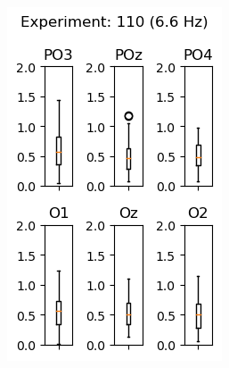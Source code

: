 \begin{figure}[ht]
    \centering
    \begin{subfigure}{0.25\linewidth}
        \includegraphics[width=\linewidth]{images/appendix/11066.png}
        \label{fig:11066}
    \end{subfigure}
    \begin{subfigure}{0.25\linewidth}

\end{subfigure}
\end{figure}
